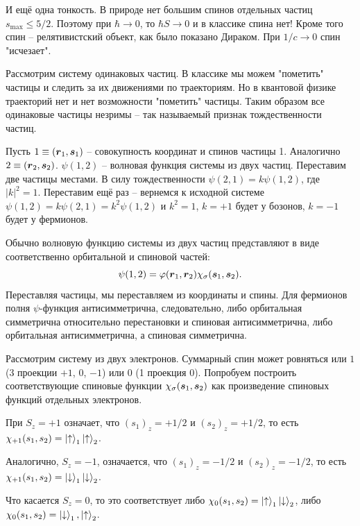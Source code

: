 И ещё одна тонкость. В природе нет большим спинов отдельных частиц $s_\text{max} \leq 5/2$. Поэтому при $\hbar \to 0$, то $\hbar S \to 0$ и в классике спина нет!
Кроме того спин -- релятивистский объект, как было показано Дираком. При $1/c \to 0$ спин "исчезает".

Рассмотрим систему одинаковых частиц.
В классике мы можем "пометить" частицы и следить за их движениями по траекториям.
Но в квантовой физике траекторий нет и нет возможности "пометить" частицы. 
Таким образом все одинаковые частицы незримы -- так называемый признак тождественности частиц.

Пусть $1 \equiv (\mbox{\boldmath $r$}_1, \mbox{\boldmath $s$}_1)$ -- совокупность координат и спинов частицы 1. Аналогично $2 \equiv (\mbox{\boldmath $r$}_2, \mbox{\boldmath $s$}_2)$.
$\psi(1,2)$ -- волновая функция системы из двух частиц.
Переставим две частицы местами.
В силу тождественности $\psi(2,1) = k \psi(1,2)$, где $|k|^2 = 1$. 
Переставим ещё раз -- вернемся к исходной системе $\psi(1,2) = k \psi(2,1) = k^2 \psi(1,2)$ и $k^2 = 1$, $k = +1$ будет у бозонов, $k=-1$ будет у фермионов.

Обычно волновую функцию системы из двух частиц представляют в виде соответственно орбитальной и спиновой частей:
\begin{equation*}
	\psi(1,2) = \varphi(\mbox{\boldmath $r$}_1, \mbox{\boldmath $r$}_2) \chi_\sigma(\mbox{\boldmath $s$}_1, \mbox{\boldmath $s$}_2).
\end{equation*}
Переставляя частицы, мы переставляем из координаты и спины.
Для фермионов полня $\psi$-функция антисимметрична, следовательно, либо орбитальная симметрична относительно перестановки и спиновая антисимметрична, либо орбитальная антисимметрична, а спиновая симметрична.

Рассмотрим систему из двух электронов. Суммарный спин может ровняться или $1$ (3 проекции $+1$, $0$, $-1$) или $0$ (1 проекция $0$).
Попробуем построить соответствующие спиновые функции $\chi_\sigma(\mbox{\boldmath $s$}_1, \mbox{\boldmath $s$}_2)$ как произведение спиновых функций отдельных электронов.

При $S_z = +1$ означает, что $(s_1)_z = +1/2$ и $(s_2)_z = +1/2$, то есть $\chi_{+1}(s_1, s_2) = \left|\uparrow\right\rangle_1 \left|\uparrow\right\rangle_2$.

Аналогично, $S_z = -1$, означается, что $(s_1)_z = -1/2$ и $(s_2)_z = -1/2$, то есть $\chi_{+1}(s_1, s_2) = \left|\downarrow\right\rangle_1 \left|\downarrow\right\rangle_2$.

Что касается $S_z = 0$, то это соответствует либо $\chi_0(s_1,s_2) = \left|\uparrow\right\rangle_1 \left|\downarrow\right\rangle_2$, либо $\chi_0 (s_1, s_2) = \left|\downarrow\right\rangle_1, \left|\uparrow\right\rangle_2$.

